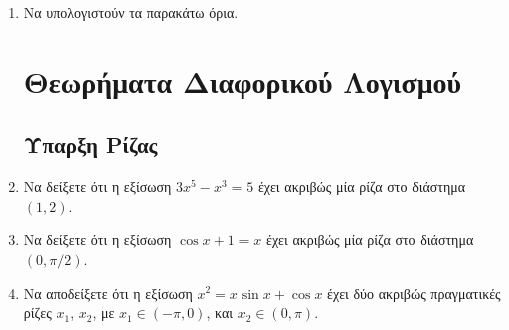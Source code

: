 \begin{enumerate}
    \item Να υπολογιστούν τα παρακάτω όρια.
      \begin{enumerate}[(i)]
      \end{enumerate}


      \section*{Θεωρήματα Διαφορικού Λογισμού}

      \subsection*{Ύπαρξη Ρίζας}

    \item Να δείξετε ότι η εξίσωση $ 3x^{5}-x^{3}=5 $ έχει ακριβώς μία ρίζα στο διάστημα 
      $ (1,2) $.
    \item Να δείξετε ότι η εξίσωση $ \cos{x} + 1 = x $ έχει ακριβώς μία ρίζα στο διάστημα 
      $ (0, \pi/2) $. 

    \item Να αποδείξετε ότι η εξίσωση $ x^{2} = x \sin{x} + \cos{x} $ 
      έχει δύο ακριβώς πραγματικές ρίζες $ x_{1} $, $ x_{2} $, με $ x_{1} \in (-\pi, 0) $, 
      και $x_{2} \in (0, \pi) $.


\end{enumerate}

